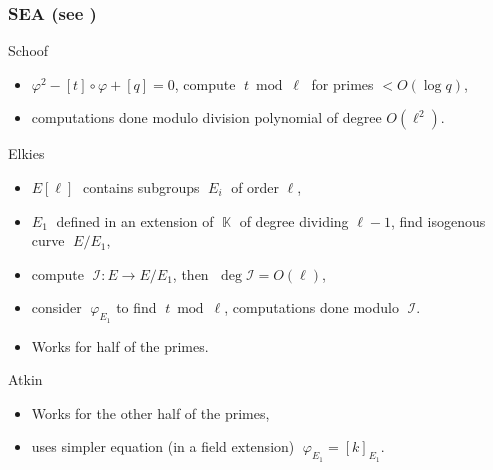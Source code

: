 \documentclass[10pt]{beamer}
\newcommand{\K}{\mathbb{K}}  %
\newcommand{\frob}{\varphi}  %
\newcommand{\0}{\mathcal{O}}  %
\newcommand{\isog}[1]{\mathcal{#1}}  %
\newcommand{\I}{\isog{I}}  %
\begin{document}

\begin{frame}
  \frametitle{SEA (see \cite{Scho95})}
  
  \begin{block}{Schoof}
    \begin{itemize}
    \item $\frob^2 - [t]\circ\frob + [q] = 0$, compute
      $\;t\bmod\ell\;$ for primes $<O(\log q)$,
    \item computations done modulo division polynomial of degree
      $O(\ell^2)$.
    \end{itemize}
  \end{block}

  \begin{block}{Elkies}
    \begin{itemize}
    \item $E[\ell]\;$ contains subgroups $\;E_i\;$ of order $\ell$,
    \item $E_1\;$ defined in an extension of $\;\K\;$ of degree
      dividing $\ell-1$, find isogenous curve $\;E/E_1$,
    \item compute $\;\I:E\rightarrow E/E_1$, then $\;\deg\I = O(\ell)$,
    \item consider $\;\frob_{E_1}$ to find $\;t\bmod\ell$,
      computations done modulo $\;\I$.
    \item Works for half of the primes.
    \end{itemize}
  \end{block}

  \begin{block}{Atkin}
    \begin{itemize}
    \item Works for the other half of the primes,
    \item uses simpler equation (in a field extension)
      $\;\frob_{E_1}=[k]_{E_1}$.
    \end{itemize}
  \end{block}
\end{frame}

\end{document}
